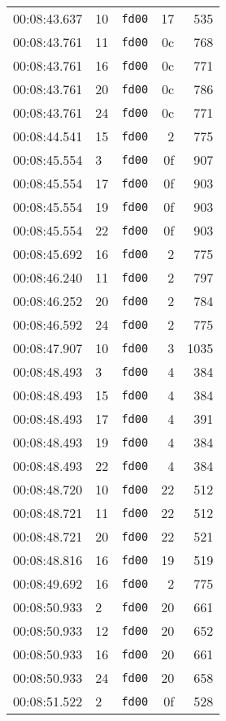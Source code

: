 \documentclass{article}
\begin{document}
\begin{longtable}{lllrr}
00:08:43.637 & 10 & \texttt{fd00} & 17 & 535 \\
00:08:43.761 & 11 & \texttt{fd00} & 0c & 768 \\
00:08:43.761 & 16 & \texttt{fd00} & 0c & 771 \\
00:08:43.761 & 20 & \texttt{fd00} & 0c & 786 \\
00:08:43.761 & 24 & \texttt{fd00} & 0c & 771 \\
00:08:44.541 & 15 & \texttt{fd00} & 2 & 775 \\
00:08:45.554 & 3 & \texttt{fd00} & 0f & 907 \\
00:08:45.554 & 17 & \texttt{fd00} & 0f & 903 \\
00:08:45.554 & 19 & \texttt{fd00} & 0f & 903 \\
00:08:45.554 & 22 & \texttt{fd00} & 0f & 903 \\
00:08:45.692 & 16 & \texttt{fd00} & 2 & 775 \\
00:08:46.240 & 11 & \texttt{fd00} & 2 & 797 \\
00:08:46.252 & 20 & \texttt{fd00} & 2 & 784 \\
00:08:46.592 & 24 & \texttt{fd00} & 2 & 775 \\
00:08:47.907 & 10 & \texttt{fd00} & 3 & 1035 \\
00:08:48.493 & 3 & \texttt{fd00} & 4 & 384 \\
00:08:48.493 & 15 & \texttt{fd00} & 4 & 384 \\
00:08:48.493 & 17 & \texttt{fd00} & 4 & 391 \\
00:08:48.493 & 19 & \texttt{fd00} & 4 & 384 \\
00:08:48.493 & 22 & \texttt{fd00} & 4 & 384 \\
00:08:48.720 & 10 & \texttt{fd00} & 22 & 512 \\
00:08:48.721 & 11 & \texttt{fd00} & 22 & 512 \\
00:08:48.721 & 20 & \texttt{fd00} & 22 & 521 \\
00:08:48.816 & 16 & \texttt{fd00} & 19 & 519 \\
00:08:49.692 & 16 & \texttt{fd00} & 2 & 775 \\
00:08:50.933 & 2 & \texttt{fd00} & 20 & 661 \\
00:08:50.933 & 12 & \texttt{fd00} & 20 & 652 \\
00:08:50.933 & 16 & \texttt{fd00} & 20 & 661 \\
00:08:50.933 & 24 & \texttt{fd00} & 20 & 658 \\
00:08:51.522 & 2 & \texttt{fd00} & 0f & 528 \\

\end{longtable}
\end{document}
